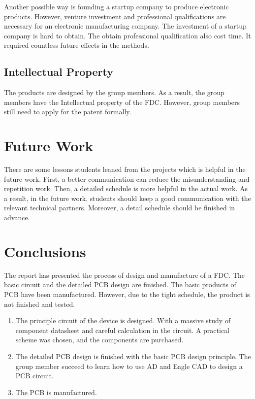 \documentclass[12pt, a4paper]{report}
\begin{document}
Another possible way is founding a startup company to produce electronic products. However, venture investment and professional qualifications are necessary for an electronic manufacturing company. The investment of a startup company is hard to obtain. The obtain professional qualification also cost time. It required countless future effects in the methods.


\subsection{Intellectual Property}
The products are designed by the group members. As a result, the group members have the Intellectual property of the FDC. However, group members still need to apply for the patent formally.



\section{Future Work}


There are some lessons students leaned from the projects which is helpful in the future work. First, a better communication can reduce the misunderstanding and repetition work. Then, a detailed schedule is more helpful in the actual work. As a result, in the future work, students should keep a good communication with the relevant technical partners. Moreover, a detail schedule should be finished in advance.


\section{Conclusions}
The report has presented the process of design and manufacture of a FDC. The basic circuit and the detailed PCB design are finished. The basic products of PCB have been manufactured. However, due to the tight schedule, the product is not finished and tested.

\begin{enumerate}
 \item The principle circuit of the device is designed. With a massive study of component datasheet and careful calculation in the circuit. A practical scheme was chosen, and the components are purchased.
 \item The detailed PCB design is finished with the basic PCB design principle. The group member succeed to learn how to use AD and Eagle CAD to design a PCB circuit.
 \item The PCB is manufactured.
 \end{enumerate}
 
\end{document}
